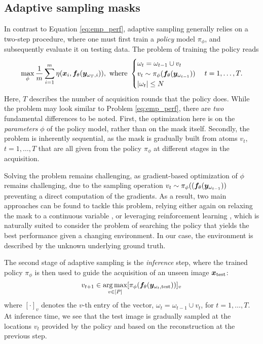 \subsection{Adaptive sampling masks}
In contrast to Equation \ref{eq:emp_perf}, adaptive sampling generally relies on a two-step procedure, where one must first train a \textit{policy} model $\pi_\phi$, and subsequently evaluate it on testing data. The problem of training the policy reads
\begin{equation}
    \max_{\phi} \frac{1}{m} \sum_{i=1}^m \eta({\bm{x}}_i, {\bm{f}}_\theta({\bm{y}}_{\omega_T,i})), \text{~where~}
    \begin{cases}
        \omega_t = \omega_{t-1}\cup v_t \\
        v_t\sim \pi_\phi({\bm{f}}_\theta({\bm{y}}_{\omega_{t-1}}))\\
        |\omega_t| \leq N
    \end{cases} t=1,\ldots,T. \label{eq:emp_adapt}
\end{equation}
Here, $T$ describes the number of acquisition rounds that the policy does. While the problem may look similar to Problem \ref{eq:emp_perf}, there are \textit{two} fundamental differences to be noted. First, the optimization here is on the \textit{parameters} $\phi$ of the policy model, rather than on the mask itself. Secondly, the problem is inherently sequential, as the mask is gradually built from atoms $v_t$, $t=1,\ldots,T$ that are all given from the policy $\pi_\phi$ at different stages in the acquisition. 

Solving the problem remains challenging, as gradient-based optimization of $\phi$ remains challenging, due to the sampling operation $v_t \sim \pi_\phi(({\bm{f}}_\theta({\bm{y}}_{\omega_{t-1}}))$ preventing a direct computation of the gradients. As a result, two main approaches can be found to tackle this problem, relying either again on relaxing the mask to a continuous variable \citep{van2021active,yin2021end}, or leveraging reinforcement learning \citep{bakker2020experimental,pineda2020active, jin2019self}, which is naturally suited to consider the problem of searching the policy that yields the best performance given a changing environment. In our case, the environment is described by the unknown underlying ground truth. 

The second stage of adaptive sampling is the \textit{inference} step, where the trained policy $\pi_\phi$ is then used to guide the acquisition of an unseen image ${\bm{x}}_{\text{test}}$:
\begin{equation}
    v_{t+1} \in \operatorname*{arg\,max}_{v \in [P]} [\pi_\phi({\bm{f}}_\theta({\bm{y}}_{\omega_t, \text{test}}))]_v \label{eq:inference_adaptive}
\end{equation}
where $[\cdot]_v$ denotes the $v$-th entry of the vector, $\omega_{t}=\omega_{t-1}\cup v_t$, for $t=1,\ldots,T$. At inference time, we see that the test image is gradually sampled at the locations $v_t$ provided by the policy and based on the reconstruction at the previous step.

